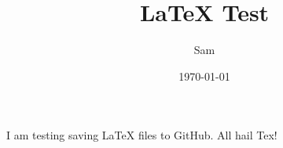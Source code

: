 \documentclass[12pt]{article}
\begin{document}
\title{LaTeX Test}
\author{Sam}
\date{\today}
\maketitle


I am testing saving LaTeX files to GitHub. All hail Tex!
\end{document}
